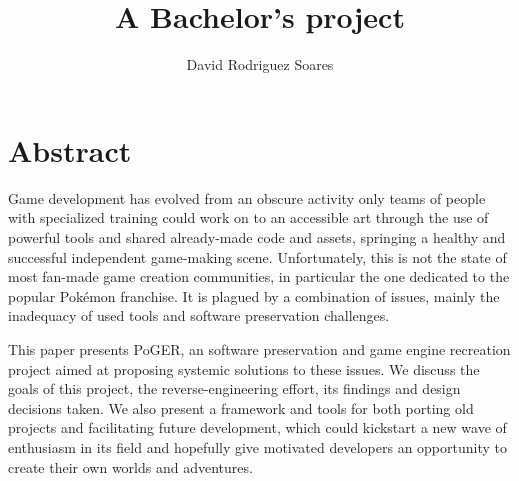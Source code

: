 \documentclass[11pt]{article}
\title{\vspace{15mm}{\HUGE PoGER : a game engine recreation and software preservation project}\\[4mm]
	A Bachelor's project}
\author{David Rodriguez Soares}
\date{}
\affil{Centre Universitaire d'Informatique,\\University of Geneva, Switzerland}
\begin{document}
\maketitle

\vfill
%
\section*{Abstract}

Game development has evolved from an obscure activity only teams of people with specialized training could work on to an accessible art through the use of powerful tools and shared already-made code and assets, springing a healthy and successful independent game-making scene. Unfortunately, this is not the state of most fan-made game creation communities, in particular the one dedicated to the popular Pokémon franchise. It is plagued by a combination of issues, mainly the inadequacy of used tools and software preservation challenges.

This paper presents PoGER, an software preservation and game engine recreation project aimed at proposing systemic solutions to these issues. We discuss the goals of this project, the reverse-engineering effort, its findings and design decisions taken. We also present a framework and tools for both porting old projects and facilitating future development, which could kickstart a new wave of enthusiasm in its field and hopefully give motivated developers an opportunity to create their own worlds and adventures.


\newpage

\begingroup
\hypersetup{linkcolor=black}
\tableofcontents
\endgroup
%





\end{document}
